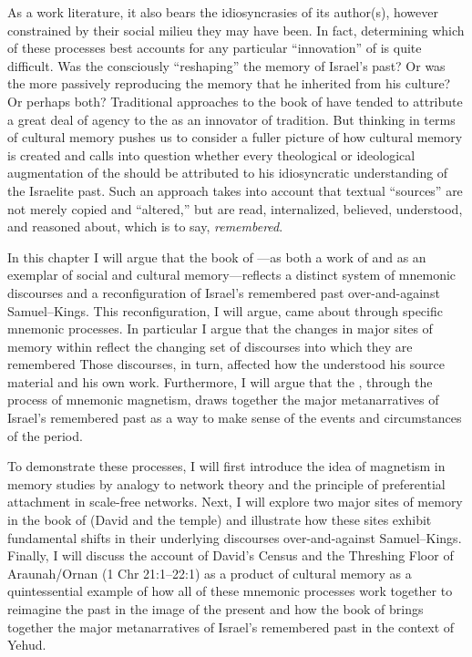 As a work literature, it also bears the idiosyncrasies of its author(s), however constrained by their social milieu they may have been. In fact, determining which of these processes best accounts for any particular ``innovation'' of \chronicles is quite difficult. Was the \chronicler consciously ``reshaping'' the memory of Israel's past? Or was the \chronicler more passively reproducing the memory that he inherited from his culture? Or perhaps both? Traditional approaches to the book of \chronicles have tended to attribute a great deal of agency to the \chronicler as an innovator of tradition. But thinking in terms of cultural memory pushes us to consider a fuller picture of how cultural memory is created and calls into question whether every theological or ideological augmentation of the \chronicler should be attributed to his idiosyncratic understanding of the Israelite past. Such an approach takes into account that textual ``sources'' are not merely copied and ``altered,'' but are read, internalized, believed, understood, and reasoned about, which is to say, \emph{remembered}.

In this chapter I will argue that the book of \chronicles---as both a work of \rwb and as an exemplar of social and cultural memory---reflects a distinct system of mnemonic discourses and a reconfiguration of Israel's remembered past over-and-against Samuel--Kings. This reconfiguration, I will argue, came about through specific mnemonic processes. In particular I argue that the changes in major sites of memory within \chronicles reflect the changing set of discourses into which they are remembered Those discourses, in turn, affected how the \chronicler understood his source material and his own work. Furthermore, I will argue that the \chronicler, through the process of mnemonic magnetism, draws together the major metanarratives of Israel's remembered past as a way to make sense of the events and circumstances of the \secondtemple period.

To demonstrate these processes, I will first introduce the idea of magnetism in memory studies by analogy to network theory and the principle of preferential attachment in scale-free networks. Next, I will explore two major sites of memory in the book of \chronicles (David and the temple) and illustrate how these sites exhibit fundamental shifts in their underlying discourses over-and-against Samuel--Kings. Finally, I will discuss the account of David's Census and the Threshing Floor of Araunah/Ornan (1 Chr 21:1--22:1) as a product of cultural memory as a quintessential example of how all of these mnemonic processes work together to reimagine the past in the image of the present and how the book of \chronicles brings together the major metanarratives of Israel's remembered past in the context of \secondtemple Yehud.


